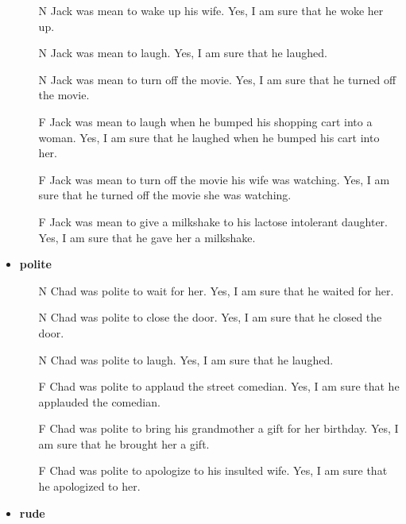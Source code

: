 \documentclass[11pt,fleqn]{article}
\newcommand{\6}{\mbox{$[\hspace*{-.6mm}[$}}
\newcommand{\9}{\mbox{$]\hspace*{-.6mm}]$}}
\begin{document}
\begin{itemize}[leftmargin=10pt,itemsep=-1pt]
\begin{enumerate}[leftmargin=10pt,topsep=0pt,itemsep=0pt]
\item[N]  	Jack was mean to wake up his wife.	Yes, I am sure that he woke her up.
\item[N]  	Jack was mean to laugh.	Yes, I am sure that he laughed.
\item[N]  	Jack was mean to turn off the movie.	Yes, I am sure that he turned off the movie.
\item[F]  	Jack was mean to laugh when he bumped his shopping cart into a woman.	Yes, I am sure that he laughed when he bumped his cart into her.
\item[F]  	Jack was mean to turn off the movie his wife was watching.	Yes, I am sure that he turned off the movie she was watching.
\item[F]  	Jack was mean to give a milkshake to his lactose intolerant daughter.	Yes, I am sure that he gave her a milkshake.

\end{enumerate}

\item {\bf polite}

\begin{enumerate}[leftmargin=10pt,topsep=0pt,itemsep=0pt]

\item[N]  	Chad was polite to wait for her.	Yes, I am sure that he waited for her.
\item[N]  	Chad was polite to close the door.	Yes, I am sure that he closed the door.
\item[N]  	Chad was polite to laugh.	Yes, I am sure that he laughed.
\item[F]  	Chad was polite to applaud the street comedian.	Yes, I am sure that he applauded the comedian.
\item[F]  	Chad was polite to bring his grandmother a gift for her birthday.	Yes, I am sure that he brought her a gift.
\item[F]  	Chad was polite to apologize to his insulted wife.	Yes, I am sure that he apologized to her.

\end{enumerate}

\item {\bf rude}

\begin{enumerate}[leftmargin=10pt,topsep=0pt,itemsep=0pt]


\end{enumerate}
\end{itemize}
\end{document}
